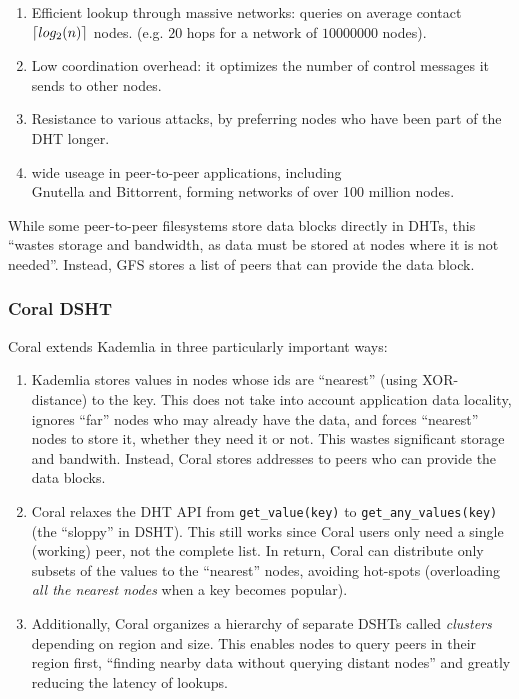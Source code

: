 \documentclass{sig-alternate}
\DeclarePairedDelimiter{\ceil}{\lceil}{\rceil}
\begin{document}
\begin{enumerate}

  \item Efficient lookup through massive networks:
        queries on average contact $ \ceil{log_2 (n)} $ nodes.
        (e.g. $20$ hops for a network of $10000000$ nodes).

  \item Low coordination overhead: it optimizes the number of
        control messages it sends to other nodes.

  \item Resistance to various attacks, by preferring nodes who have been
        part of the DHT longer.

  \item wide useage in peer-to-peer applications, including \\
        Gnutella and Bittorrent, forming networks of over 100 million nodes.

 \end{enumerate}

While some peer-to-peer filesystems store data blocks directly in DHTs,
this ``wastes storage and bandwidth, as data must be stored at nodes where it
is not needed''. Instead, GFS stores a list of peers that can provide the data block.

\subsubsection{Coral DSHT}

Coral extends Kademlia in three particularly important ways:

\begin{enumerate}

  \item Kademlia stores values in nodes whose ids are ``nearest'' (using
        XOR-distance) to the key. This does not take into account application
        data locality, ignores ``far'' nodes who may already have the data, and
        forces ``nearest'' nodes to store it, whether they need it or not.
        This wastes significant storage and bandwith. Instead, Coral stores
        addresses to peers who can provide the data blocks.

  \item Coral relaxes the DHT API from \texttt{get\_value(key)} to
        \texttt{get\_any\_values(key)} (the ``sloppy'' in DSHT).
        This still works since Coral users only need a single (working) peer,
        not the complete list. In return, Coral can distribute only subsets of
        the values to the ``nearest'' nodes, avoiding hot-spots (overloading
        \textit{all the nearest nodes} when a key becomes popular).

  \item Additionally, Coral organizes a hierarchy of separate DSHTs called
        \textit{clusters} depending on region and size. This enables nodes to
        query peers in their region first, ``finding nearby data without
        querying distant nodes'' and greatly reducing the latency of
        lookups.

\end{enumerate}
\end{document}
